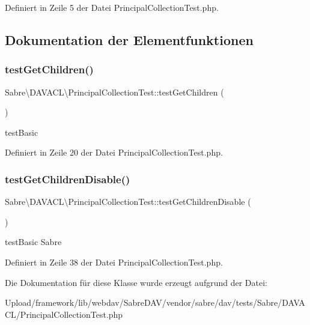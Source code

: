 Definiert in Zeile 5 der Datei Principal\+Collection\+Test.\+php.



\subsection{Dokumentation der Elementfunktionen}
\mbox{\label{class_sabre_1_1_d_a_v_a_c_l_1_1_principal_collection_test_a488cf79236a03c0cf921a14e41475fff}} 
\subsubsection{\texorpdfstring{test\+Get\+Children()}{testGetChildren()}}
{\footnotesize\ttfamily Sabre\textbackslash{}\+D\+A\+V\+A\+C\+L\textbackslash{}\+Principal\+Collection\+Test\+::test\+Get\+Children (\begin{DoxyParamCaption}{ }\end{DoxyParamCaption})}

test\+Basic 

Definiert in Zeile 20 der Datei Principal\+Collection\+Test.\+php.

\mbox{\label{class_sabre_1_1_d_a_v_a_c_l_1_1_principal_collection_test_a63bb060a6a33a19e37f8c7b7858fa681}} 
\subsubsection{\texorpdfstring{test\+Get\+Children\+Disable()}{testGetChildrenDisable()}}
{\footnotesize\ttfamily Sabre\textbackslash{}\+D\+A\+V\+A\+C\+L\textbackslash{}\+Principal\+Collection\+Test\+::test\+Get\+Children\+Disable (\begin{DoxyParamCaption}{ }\end{DoxyParamCaption})}

test\+Basic  Sabre 

Definiert in Zeile 38 der Datei Principal\+Collection\+Test.\+php.



Die Dokumentation für diese Klasse wurde erzeugt aufgrund der Datei\+:\begin{DoxyCompactItemize}
\item 
Upload/framework/lib/webdav/\+Sabre\+D\+A\+V/vendor/sabre/dav/tests/\+Sabre/\+D\+A\+V\+A\+C\+L/Principal\+Collection\+Test.\+php\end{DoxyCompactItemize}
